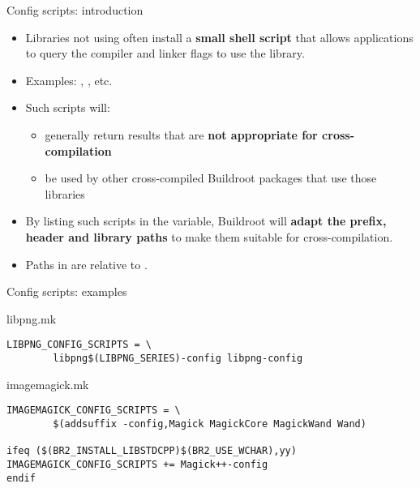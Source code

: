 \begin{frame}{Config scripts: introduction}
  \begin{itemize}
  \item Libraries not using  often install a {\bf
      small shell script} that allows applications to query the
    compiler and linker flags to use the library.
  \item Examples: , , etc.
  \item Such scripts will:
    \begin{itemize}
    \item generally return results that are {\bf not appropriate for
        cross-compilation}
    \item be used by other cross-compiled Buildroot packages that use
      those libraries
    \end{itemize}
  \item By listing such scripts in the 
    variable, Buildroot will {\bf adapt the prefix, header and library
      paths} to make them suitable for cross-compilation.
  \item Paths in  are relative to
    .
  \end{itemize}
\end{frame}

\begin{frame}[fragile]{Config scripts: examples}

  \begin{block}{libpng.mk}
    \begin{verbatim}
LIBPNG_CONFIG_SCRIPTS = \
        libpng$(LIBPNG_SERIES)-config libpng-config
\end{verbatim}
\end{block}

\begin{block}{imagemagick.mk}
  \begin{verbatim}
IMAGEMAGICK_CONFIG_SCRIPTS = \
        $(addsuffix -config,Magick MagickCore MagickWand Wand)

ifeq ($(BR2_INSTALL_LIBSTDCPP)$(BR2_USE_WCHAR),yy)
IMAGEMAGICK_CONFIG_SCRIPTS += Magick++-config
endif
\end{verbatim}
\end{block}

\end{frame}

